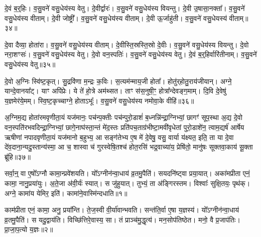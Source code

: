 दे॒वं ब॒र्॒हिः।
व॒सु॒वने॑ वसु॒धेय॑स्य वेतु।
दे॒वीर्द्वारः॑।
व॒सु॒वने॑ वसु॒धेय॑स्य वियन्तु।
दे॒वी उ॒षासा॒नक्ता᳚।
व॒सु॒वने॑ वसु॒धेय॑स्य वीताम्।
दे॒वी जोष्ट्री᳚।
व॒सु॒वने॑ वसु॒धेय॑स्य वीताम्।
दे॒वी ऊ॒र्जाहु॑ती।
व॒सु॒वने॑ वसु॒धेयस्य॑ वीताम्॥३४॥

दे॒वा दैव्या॒ होता॑रा।
व॒सु॒वने॑ वसु॒धेय॑स्य वीताम्।
दे॒वीस्ति॒स्रस्ति॒स्रो दे॒वीः।
व॒सु॒वने॑ वसु॒धेय॑स्य वियन्तु।
दे॒वो नरा॒शꣳसः॑।
व॒सु॒वने॑ वसु॒धेय॑स्य वेतु।
दे॒वो वन॒स्पतिः॑।
व॒सु॒वने॑ वसु॒धेय॑स्य वेतु।
दे॒वं ब॒र्॒हिर्वारि॑तीनाम्।
व॒सु॒वने॑ वसु॒धेय॑स्य वेतु॥३५॥

दे॒वो अ॒ग्निः स्वि॑ष्ट॒कृत्।
सु॒द्रवि॑णा म॒न्द्रः क॒विः।
स॒त्यम॑न्माय॒जी होता᳚।
होतु॑र्‌\mbox{}होतु॒राय॑जीयान्।
अग्ने॒ यान्दे॒वानया᳚ट्।
याꣳ अपि॑प्रेः।
ये ते॑ हो॒त्रे अम॑थ्सत।
ताꣳ स॑स॒नुषी॒ꣳ॒ होत्रा᳚न्देवङ्ग॒माम्।
दि॒वि दे॒वेषु॑ य॒ज्ञमेर॑ये॒मम्।
स्वि॒ष्ट॒कृच्चाग्ने॒ होता\-ऽभूः᳚।
व॒सु॒वने॑ वसु॒धेय॑स्य नमोवा॒के वीहि॑॥३६॥\anuvakamend[वी॒तां॒ वे॒त्वभू॒रेकं॑ च]

अ॒ग्निम॒द्य होता॑रमवृणीता॒यं यज॑मानः॒ पच॑न्प॒क्तीः पच॑न्पुरो॒डाशं॑ ब॒ध्नन्नि॑न्द्रा॒ग्निभ्यां॒ छागꣳ॑ सूप॒स्था अ॒द्य दे॒वो वन॒स्पति॑रभवदिन्द्रा॒ग्निभ्यां॒ छागे॒नाघ॑स्ता॒न्तं मे॑द॒स्तः प्रति॑\-पच॒ताग्र॑भीष्टा॒मवी॑वृधेतां पुरो॒डाशे॑न॒ त्वाम॒द्यर्\mbox{}ष॑ आर्\mbox{}षेय ऋषीणां नपादवृणीता॒यं यज॑मानो ब॒हुभ्य॒ आ सङ्ग॑तेभ्य ए॒ष मे॑ दे॒वेषु॒ वसु॒ वार्या य॑क्ष्यत॒ इति॒ ता या दे॒वा दे॑व॒दाना॒न्यदु॒स्तान्य॑स्मा॒ आ च॒ शास्वा च॑ गुरस्वेषि॒तश्च॑ होत॒रसि॑ भद्र॒वाच्या॑य॒ प्रेषि॑तो॒ मानु॑षः सूक्तवा॒काय॑ सू॒क्ता ब्रू॑हि॥३७॥\anuvakamend[अ॒ग्निम॒द्यैकम्᳚]






\clearpage
{}
\setcounter{anuvakam}{0}

सर्वा॒न्॒ वा ए॒षो᳚\-ऽग्नौ कामा॒न्प्रवे॑शयति।
यो᳚ऽग्नीन॑न्वा॒धाय॑ व्र॒तमु॒पैति॑।
सयदनि॑ष्ट्वा प्रया॒यात्।
अका॑मप्रीता एनं॒ कामा॒ नानु॒प्रया॑युः।
अ॒ते॒जा अ॑वी॒र्यः॑ स्यात्।
स जु॑हुयात्।
तुभ्यं॒ ता अ॑ङ्गिरस्तम।
विश्वाः᳚ सुक्षि॒तयः॒ पृथ॑क्।
अग्ने॒ कामा॑य येमिर॒ इति॑।
कामा॑ने॒वास्मि॑न्दधाति॥१॥

काम॑प्रीता एनं॒ कामा॒ अनु॒ प्रया᳚न्ति।
ते॒ज॒स्वी वी॒र्या॑वान्भवति।
सन्त॑ति॒र्वा ए॒षा य॒ज्ञस्य॑।
यो᳚ऽग्नीन॑न्वा॒धाय॑ व्र॒तमु॒पैति॑।
स यदु॒द्वाय॑ति।
विच्छि॑त्तिरे॒वास्य॒ सा।
तं प्राञ्च॑मु॒द्धृत्य॑।
मन॒सोप॑तिष्ठेत।
मनो॒ वै प्र॒जा\-प॑तिः।
प्रा॒जा॒प॒त्यो य॒ज्ञः॥२॥

